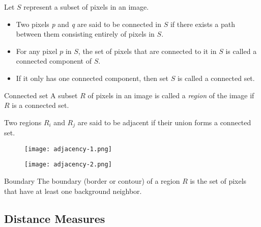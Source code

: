 
\begin{frame}
Let $S$ represent a subset of pixels in an image.
\begin{itemize}
\item Two pixels \textit{p} and \textit{q} are said to be connected in $S$ if there exists a path between them consisting entirely of pixels in $S$.
\item For any pixel $p$ in $S$, the set of pixels that are connected to it in $S$ is
called a connected component of $S$.
\item If it only has one connected component, then set $S$ is called a connected set.
\end{itemize}
\end{frame}


\begin{frame}
\begin{block}{Connected set}
A subset $R$ of pixels in an image is called a \textit{region} of the image if $R$ is a connected set.
\end{block}
Two regions $R_{i}$ and $R_{j}$ are said to be adjacent if their union forms a connected set.
\begin{figure}
\centering
\texttt{[image: adjacency-1.png]}
\end{figure}
\begin{figure}
\centering
\texttt{[image: adjacency-2.png]}
\end{figure}
\end{frame}


\begin{frame}
\begin{block}{Boundary}
The boundary (border or contour) of a region $R$ is the set of pixels that have at least one background neighbor.
\end{block}
\end{frame}


\subsection{Distance Measures}

